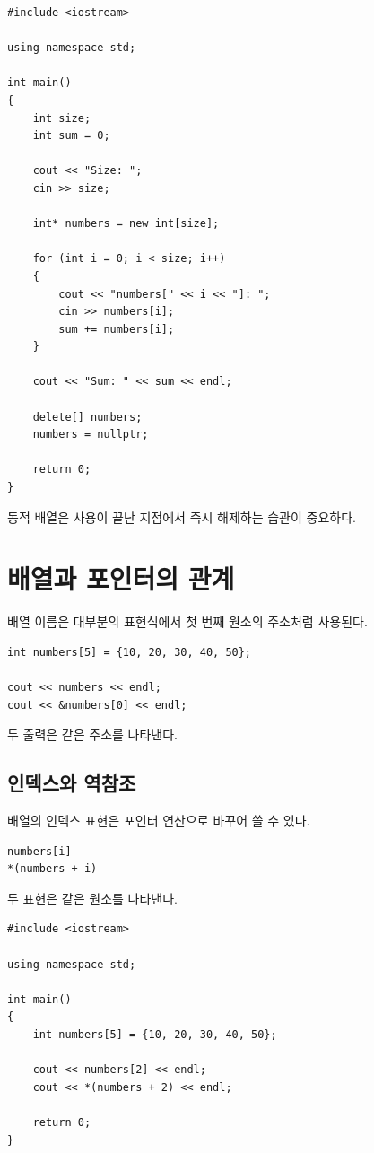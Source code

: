 \documentclass[11pt,a4paper]{article}
\begin{document}
\begin{lstlisting}
#include <iostream>

using namespace std;

int main()
{
    int size;
    int sum = 0;

    cout << "Size: ";
    cin >> size;

    int* numbers = new int[size];

    for (int i = 0; i < size; i++)
    {
        cout << "numbers[" << i << "]: ";
        cin >> numbers[i];
        sum += numbers[i];
    }

    cout << "Sum: " << sum << endl;

    delete[] numbers;
    numbers = nullptr;

    return 0;
}
\end{lstlisting}

동적 배열은 사용이 끝난 지점에서 즉시 해제하는 습관이 중요하다.

\section{배열과 포인터의 관계}

배열 이름은 대부분의 표현식에서 첫 번째 원소의 주소처럼 사용된다.

\begin{lstlisting}
int numbers[5] = {10, 20, 30, 40, 50};

cout << numbers << endl;
cout << &numbers[0] << endl;
\end{lstlisting}

두 출력은 같은 주소를 나타낸다.

\subsection{인덱스와 역참조}

배열의 인덱스 표현은 포인터 연산으로 바꾸어 쓸 수 있다.

\begin{lstlisting}
numbers[i]
*(numbers + i)
\end{lstlisting}

두 표현은 같은 원소를 나타낸다.

\begin{lstlisting}
#include <iostream>

using namespace std;

int main()
{
    int numbers[5] = {10, 20, 30, 40, 50};

    cout << numbers[2] << endl;
    cout << *(numbers + 2) << endl;

    return 0;
}
\end{lstlisting}
\end{document}
